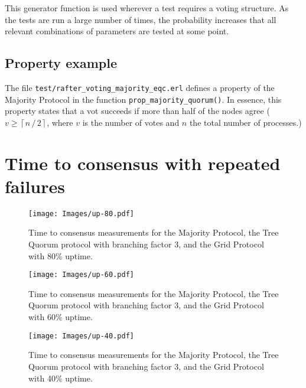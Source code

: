 \documentclass[12pt,chapterprefix=true,toc=bibliography,numbers=noendperiod,
               footnotes=multiple,twoside]{scrreprt}
\begin{document}
This generator function is used wherever a test requires a voting structure. As the tests are run a large number of times, the probability increases that all relevant combinations of parameters are tested at some point.

\subsection{Property example}
\label{ssc:property}

The file \texttt{test/rafter\_voting\_majority\_eqc.erl} defines a property of the Majority Protocol in the function \texttt{prop\_majority\_quorum()}. In essence, this property states that a vot succeeds if more than half of the nodes agree (\(v \ge \left\lceil n \, / \, 2 \right\rceil \), where \(v\) is the number of votes and \(n\) the total number of processes.)

\section{Time to consensus with repeated failures}
\label{sc:ttc-graphs}

\begin{figure}[h]
    \centering
    \texttt{[image: Images/up-80.pdf]}
    \caption{Time to consensus measurements for the Majority Protocol, the Tree Quorum protocol with branching factor 3, and the Grid Protocol with 80\% uptime.}
    \label{fig:up-80}
\end{figure}

\begin{figure}[h]
    \centering
    \texttt{[image: Images/up-60.pdf]}
    \caption{Time to consensus measurements for the Majority Protocol, the Tree Quorum protocol with branching factor 3, and the Grid Protocol with 60\% uptime.}
    \label{fig:up-60}
\end{figure}

\begin{figure}[h]
    \centering
    \texttt{[image: Images/up-40.pdf]}
    \caption{Time to consensus measurements for the Majority Protocol, the Tree Quorum protocol with branching factor 3, and the Grid Protocol with 40\% uptime.}
    \label{fig:up-40}
\end{figure}


%
%

\end{document}
